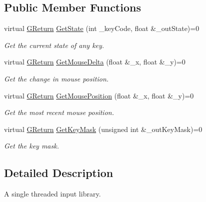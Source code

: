 \subsection*{Public Member Functions}
\begin{DoxyCompactItemize}
\item 
virtual \mbox{\hyperlink{namespace_g_w_a67a839e3df7ea8a5c5686613a7a3de21}{G\+Return}} \mbox{\hyperlink{class_g_w_1_1_s_y_s_t_e_m_1_1_g_input_a73d61dd3d6c6751f52267ed7abb03994}{Get\+State}} (int \+\_\+key\+Code, float \&\+\_\+out\+State)=0
\begin{DoxyCompactList}\small\item\em Get the current state of any key. \end{DoxyCompactList}\item 
virtual \mbox{\hyperlink{namespace_g_w_a67a839e3df7ea8a5c5686613a7a3de21}{G\+Return}} \mbox{\hyperlink{class_g_w_1_1_s_y_s_t_e_m_1_1_g_input_a775fca7ad71371f369e3ad69fb32603a}{Get\+Mouse\+Delta}} (float \&\+\_\+x, float \&\+\_\+y)=0
\begin{DoxyCompactList}\small\item\em Get the change in mouse position. \end{DoxyCompactList}\item 
virtual \mbox{\hyperlink{namespace_g_w_a67a839e3df7ea8a5c5686613a7a3de21}{G\+Return}} \mbox{\hyperlink{class_g_w_1_1_s_y_s_t_e_m_1_1_g_input_a351eb04ac4a8699f6e4e416860d264b2}{Get\+Mouse\+Position}} (float \&\+\_\+x, float \&\+\_\+y)=0
\begin{DoxyCompactList}\small\item\em Get the most recent mouse position. \end{DoxyCompactList}\item 
virtual \mbox{\hyperlink{namespace_g_w_a67a839e3df7ea8a5c5686613a7a3de21}{G\+Return}} \mbox{\hyperlink{class_g_w_1_1_s_y_s_t_e_m_1_1_g_input_a448ee14346a393286b0dfe1dc61ca93d}{Get\+Key\+Mask}} (unsigned int \&\+\_\+out\+Key\+Mask)=0
\begin{DoxyCompactList}\small\item\em Get the key mask. \end{DoxyCompactList}\end{DoxyCompactItemize}


\subsection{Detailed Description}
A single threaded input library. 

